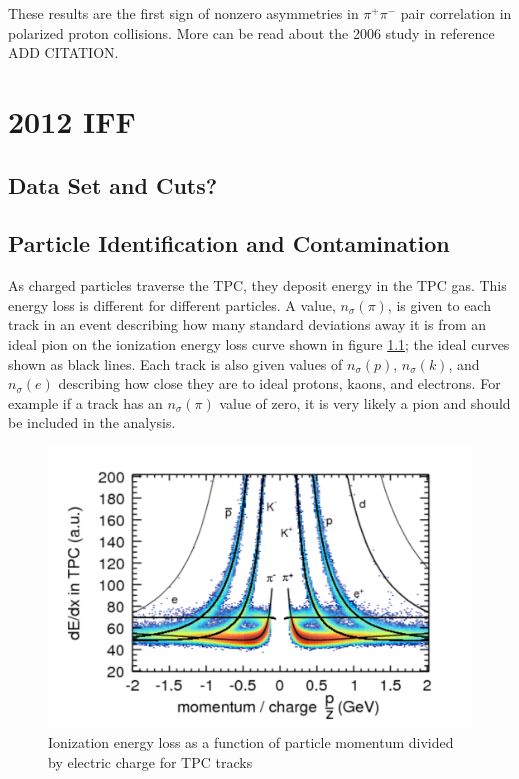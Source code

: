 \documentclass[abstract = on,listof=totoc, bibliography=totoc]{scrreprt}
\newcommand{\pip}{\pi^+}
\newcommand{\pim}{\pi^-}
\newcommand{\pair}{$\pip\pim$ }
\begin{document}
These results are the first sign of nonzero asymmetries in \pair pair correlation in polarized proton collisions. More can be read about the 2006 study in reference \cite{} ADD CITATION.



\chapter{2012 IFF}

\section{Data Set and Cuts?}

\section{Particle Identification and Contamination}



As charged particles traverse the TPC, they deposit energy in the TPC gas. This energy loss is different for different particles. A value, $n_\sigma(\pi)$, is given to each track in an event describing how many standard deviations away it is from an ideal pion on the ionization energy loss curve shown in figure \ref{fig:tpcDedx2}; the ideal curves shown as black lines. Each track is also given values of $n_\sigma(p)$, $n_\sigma(k)$, and $n_\sigma(e)$ describing how close they are to ideal protons, kaons, and electrons. For example if a track has an $n_\sigma(\pi)$ value of zero, it is very likely a pion and should be included in the analysis. 

 \begin{figure}
\begin{center}
\includegraphics[width = .8\textwidth]{TPC_dedx2}
\caption[Ionization energy loss in TPC]{Ionization energy loss as a function of particle momentum divided by electric charge for TPC tracks}
\label{fig:tpcDedx2}
\end{center}
\end{figure}
\end{document}

